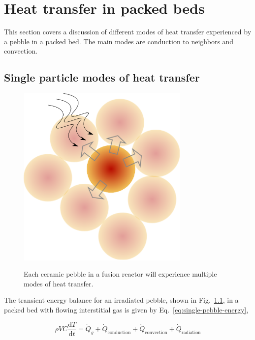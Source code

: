 \chapter{Heat transfer in packed beds} \label{ch:modeling-heat-transfer}
This section covers a discussion of different modes of heat transfer experienced by a pebble in a packed bed. The main modes are conduction to neighbors and convection.




\section{Single particle modes of heat transfer}

\begin{figure}[t]
	\centering
	\caption{Each ceramic pebble in a fusion reactor will experience multiple modes of heat transfer.}
	\includegraphics[width=0.75\textwidth]{chapters/figures/pebble-complete-heat-transfer}\label{fig:peb-comp-ht}
\end{figure}

The transient energy balance for an irradiated pebble, shown in Fig.~\ref{fig:peb-comp-ht}, in a packed bed with flowing interstitial gas is given by Eq.~\ref{eq:single-pebble-energy},

\begin{equation}\label{eq:single-pebble-energy}
	\rho V C \frac{\mathrm{d}T}{\mathrm{d}t} = \dot{Q}_g + \dot{Q}_\text{conduction} + \dot{Q}_\text{convection} + \dot{Q}_\text{radiation}
\end{equation}

